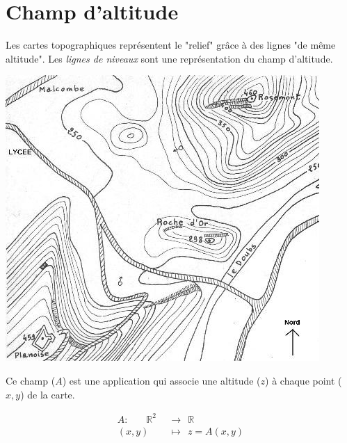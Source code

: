 
\section{Champ d'altitude}
%
Les cartes topographiques représentent le "relief" grâce à des lignes "de même altitude".
Les {\it lignes de niveaux} sont une représentation du champ d'altitude.

\begin{center}
\includegraphics[scale=5]{./champs/topographique}
\end{center}

Ce champ ($A$) est une application qui associe une altitude ($z$) à chaque point ($x,y$) de la carte.

\begin{align*}
A :\ \ \ \ \ \ \ \ \mathbb{R} ^2 \ \  & \rightarrow \ \ \mathbb{R} \\
(x,y) \ \ & \mapsto \ \ z = A(x,y)
\end{align*}



